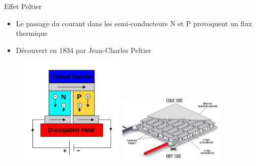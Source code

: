 {
\begin{frame}{Effet Peltier}
\begin{itemize}
\item Le passage du courant dans les semi-conducteurs N et P provoquent un flux thermique
\item Découvert en 1834 par Jean-Charles Peltier
\end{itemize}
\begin{figure}
\centering
\includegraphics[width=5cm]{images/peltierEffect}
\includegraphics[width=5cm]{images/schematic-diagram-of-peltier-module}
\end{figure}
\end{frame}
}

